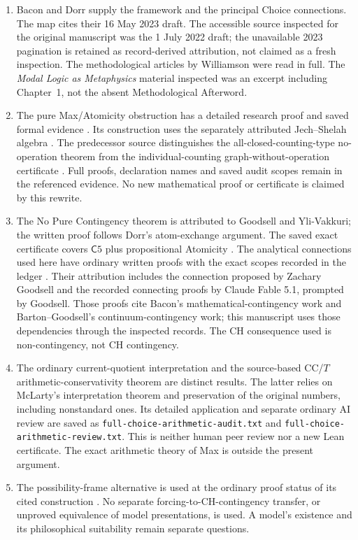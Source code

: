 \documentclass[11pt]{article}
\newcommand{\C}{\mathsf C}
\begin{document}
\begin{enumerate}[leftmargin=*,itemsep=0.45em]
\item Bacon and Dorr supply the framework and the principal Choice connections. The map cites their 16 May 2023 draft. The accessible source inspected for the original manuscript was the 1 July 2022 draft; the unavailable 2023 pagination is retained as record-derived attribution, not claimed as a fresh inspection. The methodological articles by Williamson were read in full. The \emph{Modal Logic as Metaphysics} material inspected was an excerpt including Chapter~1, not the absent Methodological Afterword.

\item The pure Max/Atomicity obstruction has a detailed research proof and saved formal evidence \citep{maxatomicity}. Its construction uses the separately attributed Jech--Shelah algebra \citep[p.~749]{jechshelah}. The predecessor source distinguishes the all-closed-counting-type no-operation theorem from the individual-counting graph-without-operation certificate \citep{predecessor}. Full proofs, declaration names and saved audit scopes remain in the referenced evidence. No new mathematical proof or certificate is claimed by this rewrite.

\item The No Pure Contingency theorem is attributed to Goodsell and Yli-Vakkuri; the written proof follows Dorr's atom-exchange argument. The saved exact certificate covers $\C5$ plus propositional Atomicity \citep{npc,npcverification}. The analytical connections used here have ordinary written proofs with the exact scopes recorded in the ledger \citep{analysisconnections}. Their attribution includes the connection proposed by Zachary Goodsell and the recorded connecting proofs by Claude Fable 5.1, prompted by Goodsell. Those proofs cite Bacon's mathematical-contingency work and Barton--Goodsell's continuum-contingency work; this manuscript uses those dependencies through the inspected records. The CH consequence used is non-contingency, not CH contingency.

\item The ordinary current-quotient interpretation and the source-based CC/$T$ arithmetic-conservativity theorem are distinct results. The latter relies on McLarty's interpretation theorem and preservation of the original numbers, including nonstandard ones. Its detailed application and separate ordinary AI review are saved as \texttt{full-choice-arithmetic-audit.txt} and \texttt{full-choice-arithmetic-review.txt}. This is neither human peer review nor a new Lean certificate. The exact arithmetic theory of Max is outside the present argument.

\item The possibility-frame alternative is used at the ordinary proof status of its cited construction \citep{modalized}. No separate forcing-to-CH-contingency transfer, or unproved equivalence of model presentations, is used. A model's existence and its philosophical suitability remain separate questions.
\end{enumerate}
\end{document}

